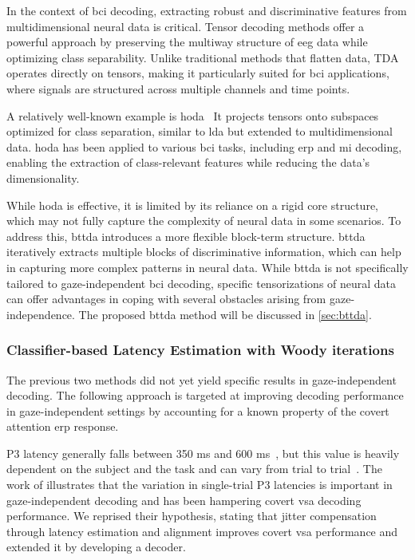 In the context of \ac{bci} decoding, extracting robust and discriminative
features from multidimensional neural data is critical.
Tensor decoding methods offer a powerful approach by preserving the multiway structure
of \ac{eeg} data while optimizing class separability.
Unlike traditional methods that flatten data, TDA operates directly on tensors,
making it particularly suited for \ac{bci} applications, where signals are structured
across multiple channels and time points.

A relatively well-known example is \ac{hoda}~\cite{Phan2010}
It projects tensors onto subspaces optimized for class separation, similar to \ac{lda} but extended to multidimensional data.
\Ac{hoda} has been applied to various \ac{bci} tasks, including \ac{erp} and
\ac{mi} decoding, enabling the extraction of class-relevant features while reducing
the data's dimensionality.

While \ac{hoda} is effective, it is limited by its reliance on a rigid core
structure, which may not fully capture the complexity of neural data in some
scenarios. To address this, \ac{bttda}
introduces a more flexible block-term structure.
\ac{bttda} iteratively extracts multiple blocks of
discriminative information, which can help in capturing more complex patterns
in neural data.
While \ac{bttda} is not specifically tailored to
gaze-independent \ac{bci} decoding, specific tensorizations of neural data can
offer advantages in coping with several obstacles arising from
gaze-independence.
The proposed \ac{bttda} method will be discussed in \cref{sec:bttda}.

\subsubsection{Classifier-based Latency Estimation with Woody iterations}

The previous two methods did not yet yield specific results in
gaze-in\-de\-pen\-dent
decoding.
The following approach is targeted at improving decoding performance in
gaze-independent settings by accounting for a known property of the covert
attention \ac{erp} response.

P3 latency generally falls between 350 ms and 600 ms~\cite{Luck2014}, but this
value is heavily dependent on the subject and the task and can vary from trial
to trial~\cite{Ouyang2017}.
The work of \cite{Arico2014} illustrates that the variation in single-trial P3
latencies is important in gaze-independent decoding and has been hampering covert
\ac{vsa} decoding performance.
We reprised their hypothesis, stating that jitter compensation through latency
estimation and alignment improves
covert \ac{vsa} performance and extended it by developing a decoder.


